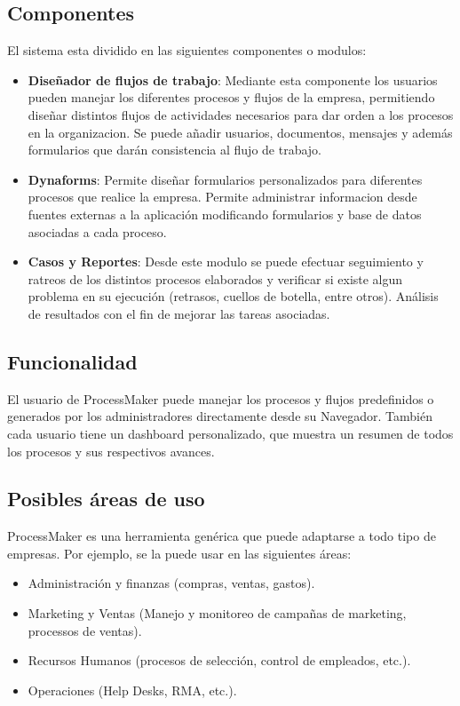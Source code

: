 \subsection{Componentes}
El sistema esta dividido en las siguientes componentes o modulos:
\begin{itemize}
\item  \textbf{Diseñador de flujos de trabajo}: Mediante esta componente los usuarios pueden manejar los diferentes procesos y flujos de la empresa, permitiendo diseñar distintos flujos de actividades necesarios para dar orden a los procesos en la organizacion.
Se puede añadir usuarios, documentos, mensajes y además formularios que darán consistencia al flujo de trabajo.

\item \textbf{Dynaforms}: Permite diseñar formularios personalizados para diferentes  procesos que realice la empresa. Permite administrar informacion desde fuentes externas a la aplicación modificando formularios y base de datos asociadas a cada proceso.

\item \textbf{Casos y Reportes}: Desde este modulo se puede efectuar seguimiento y ratreos de los distintos procesos elaborados y verificar si existe algun problema en su ejecución (retrasos, cuellos de botella, entre otros). Análisis de resultados con el fin de mejorar las tareas asociadas.
\end{itemize}

\subsection{Funcionalidad}
El usuario de ProcessMaker puede manejar los procesos y flujos predefinidos o generados por los administradores directamente desde su Navegador. También cada usuario tiene un dashboard personalizado, que muestra un resumen de todos los procesos y sus respectivos avances.

\subsection{Posibles áreas de uso}
ProcessMaker es una herramienta genérica que puede adaptarse a todo tipo de empresas. Por ejemplo, se la puede usar en las siguientes áreas:
\begin{itemize}
\item Administración y finanzas (compras, ventas, gastos).
\item Marketing y Ventas (Manejo y monitoreo de campañas de marketing, processos de ventas).
\item Recursos Humanos (procesos de selección, control de empleados, etc.).
\item Operaciones (Help Desks, RMA, etc.).
\end{itemize}

